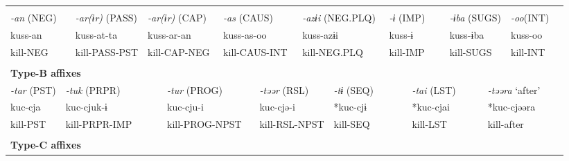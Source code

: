 \tabletail{}
\tablelasttail{}
\begin{tabularx}{\textwidth}{XXm{}XXXXXXXXXXXXXXXXXXXX}
\lsptoprule
\multicolumn{23}{X}{{\bfseries Type-A affixes}}\\
\multicolumn{3}{X}{{ \textit{{}-an} (NEG)}} & \multicolumn{3}{X}{{ \textit{{}-ar(ɨr)} (PASS)}} & \multicolumn{4}{X}{{ \textit{{}-ar(ɨr)} (CAP)}} & \multicolumn{4}{X}{{ \textit{{}-as} (CAUS)}} & \multicolumn{3}{X}{{ \textit{{}-azɨi} (NEG.PLQ)}} & \multicolumn{2}{X}{{ \textit{{}-ɨ} (IMP)}} & \multicolumn{2}{X}{{ \textit{{}-ɨba} (SUGS)}} & { \textit{{}-oo}(INT)} & \\
\multicolumn{3}{X}{{ kuss-an}} & \multicolumn{3}{X}{{ kuss-at-ta}} & \multicolumn{4}{X}{{ kuss-ar-an}} & \multicolumn{4}{X}{{ kuss-as-oo}} & \multicolumn{3}{X}{{ kuss-azɨi}} & \multicolumn{2}{X}{{ kuss-ɨ}} & \multicolumn{2}{X}{{ kuss-ɨba}} & { kuss-oo} & \\
\multicolumn{3}{X}{kill-NEG} & \multicolumn{3}{X}{kill-PASS-PST} & \multicolumn{4}{X}{kill-CAP-NEG} & \multicolumn{4}{X}{kill-CAUS-INT} & \multicolumn{3}{X}{kill-NEG.PLQ} & \multicolumn{2}{X}{kill-IMP} & \multicolumn{2}{X}{kill-SUGS} & kill-INT & \\
\multicolumn{23}{X}{}\\
\multicolumn{23}{X}{{\bfseries Type-B affixes}}\\
\multicolumn{2}{X}{{ \textit{{}-tar} (PST)}} & \multicolumn{6}{X}{{ \textit{{}-tuk} (PRPR)}} & \multicolumn{3}{X}{{ \textit{{}-tur} (PROG)}} & \multicolumn{4}{X}{{ \textit{{}-təər} (RSL)}} & \multicolumn{3}{X}{{ \textit{{}-tɨ} (SEQ)}} & \multicolumn{2}{X}{{ \textit{{}-tai} (LST)}} & \multicolumn{3}{X}{{ \textit{{}-təəra} ‘after’}}\\
\multicolumn{2}{X}{{ kuc-cja}} & \multicolumn{6}{X}{{ kuc-cjuk-ɨ}} & \multicolumn{3}{X}{{ kuc-cju-i}} & \multicolumn{4}{X}{{ kuc-cjə-i}} & \multicolumn{3}{X}{{ *kuc-cjɨ}} & \multicolumn{2}{X}{{ *kuc-cjai}} & \multicolumn{3}{X}{{ *kuc-cjəəra}}\\
\multicolumn{2}{X}{kill-PST} & \multicolumn{6}{X}{kill-PRPR-IMP} & \multicolumn{3}{X}{kill-PROG-NPST} & \multicolumn{4}{X}{kill-RSL-NPST} & \multicolumn{3}{X}{kill-SEQ} & \multicolumn{2}{X}{kill-LST} & \multicolumn{3}{X}{{ kill-after}}\\
\multicolumn{2}{X}{} & \multicolumn{6}{X}{} & \multicolumn{3}{X}{} & \multicolumn{4}{X}{} & \multicolumn{3}{X}{} & \multicolumn{2}{X}{} & \multicolumn{3}{X}{}\\
\multicolumn{23}{X}{{\bfseries Type-C affixes}}\\

\end{tabularx}
